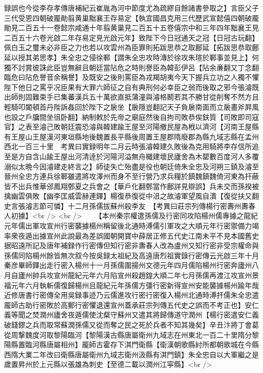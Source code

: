 録誤也今從李存孝傳唐補紀云崔胤為河中節度尤為疏繆自餘諸書參取之】言臣父子三代受恩四朝破龎勛翦黄巢黜襄王存易定【執宜國昌克用三代歷武宣懿僖四朝破龎勛見二百五十一卷懿宗咸通十年翦黄巢見二百五十五卷僖宗中和三年四年黜襄王見二百五十六卷光啟二年存易定見光啟元年】致陛下今日冠通天之冠【日冠古玩翻】佩白玉之璽未必非臣之力也若以攻雲州為臣罪則拓跋思恭之取鄜延【拓跋思恭取鄜延以授其弟思孝】朱全忠之侵徐鄆【謂朱全忠攻時漙於徐攻朱瑄於鄆事並見上】何獨不討賞彼誅此臣豈無辭且朝廷當阽危之時則譽臣為韓彭伊呂【阽余亷翻又丁念翻臨危曰阽危譽音余稱譽】及既安之後則罵臣為戎羯胡夷今天下握兵立功之人獨不懼陛下他日之罵乎况臣果有大罪六師征之自有典刑何必幸臣之弱而後取之邪今張濬既出師則固難束手已集蕃漢兵五十萬欲直抵蒲潼與濬格鬭若其不勝甘從削奪不然方且輕騎叩閽頓首丹陛訴姦回於陛下之扆坐【扆隱豈翻記天子負扆南面而立扆畫斧屛風也設之戶牖間坐徂卧翻】納制敕於先帝之廟庭然後自拘司敗恭俟鈇質【司敗即司寇官】之表至濬己敗朝廷震恐濬與韓建踰王屋至河陽撤民屋為栰以濟河【河南王屋縣有王屋山王屋漢河東垣縣地後魏置長平縣後周置王屋郡隋廢郡為縣九域志縣在孟州西北一百三十里　考異曰實録明年二月云時張濬韓建久敗後為克用騎將李存信所追至是方自含山踰王屋出河清逹於河陽河溢無舟檝建壞民廬舍為木罌數百度河人多覆溺似太晩今因濬建走終言之】師徒失亡殆盡是役也朝廷倚朱全忠及河朔三鎮及濬至晉州全忠方連兵徐鄆雖遣將攻澤州而身不至行營乃求兵糧於鎮魏鎮魏倚河東為扞蔽皆不出兵惟華邠鳳翔鄄夏之兵會之【華戶化翻鄄當作鄜詳見辯誤】兵未交而孫揆被擒幽雲俱敗【幽李匡威雲赫連鐸】楊復恭復從中沮之故濬軍望風自潰【復從扶又翻史言張濬志節可憐】十二月孫儒拔蘇州殺李友　【考異曰莊宗列傳楊行密夀州夀春人初據】<br />
<br />
　　【本州秦宗權遣孫儒及行密同攻陷楊州儒專據之龍紀元年儒出軍攻宣州行密襲據楊州稱留後北通時溥儒引軍攻之大順元年行密禦備力竭率衆夜遁出據宣州此說最為差誤國朝開寶中薛居正修五代史江南未平不見本國舊史据昭遠所記及唐年補録作行密傳但知行密非夀春人改為盧州又知行密非受宗權命與孫儒同陷楊州餘皆無次叙今按吳録太祖紀及高遠唐烈祖實錄行密傳云光啟三年十月秦彦畢師鐸出走行密入楊州十一月孫儒圍揚州文德元年四月儒陷楊州行密奔廬州八月自廬州帥兵攻宣州龍紀元年六月陷宣州殺趙鍠大順二年七月孫儒再渡江攻宣州景福元年六月執斬儒復歸楊州且龍紀元年孫儒方彊行密新得宣州安能襲據楊州踰年哉近修唐書行密傳全用吳録事迹乃云儒進攻行密行密復入楊州北通時溥扞儒朱全忠遣龎師古助行密敗於高郵行密懼退還宣州蓋承莊宗列傳五代史之誤而不考正也】安仁義等聞之焚潤州廬舍夜遁儒使沈粲守蘇州又遣其將歸傳道守潤州【楊行密遣安仁義破錢鏐之兵而取常蘇潤孫儒又從而奪之民之死於兵者不知其幾矣】辛丑汴將丁會葛從周撃魏度河取黎陽臨河【黎陽漢古縣唐屬衛州九域志在州東北一百二十里隋分黎陽縣置臨河縣唐屬相州】龎師古霍存下淇門衛縣【衛漢朝歌縣紂所都朝歌城在今縣西隋大業二年改曰衛縣唐屬衛州九域志衛州汲縣有淇門鎮】朱全忠自以大軍繼之是歲置昇州於上元縣以張雄為刺史【至德二載以潤州江寜縣】<br />

